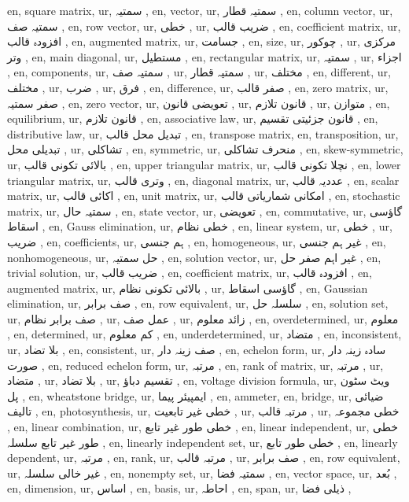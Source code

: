 en, square matrix,
ur, سمتیہ ,
en, vector,
ur, سمتیہ قطار ,
en, column vector,
ur, سمتیہ صف ,
en, row vector,
ur, خطی ,
ur,  ضریب قالب ,
en, coefficient matrix,
ur, افزودہ قالب ,
en, augmented matrix,
ur, جسامت ,
en, size,
ur, چوکور ,
ur, مرکزی وتر ,
en, main diagonal,
ur, مستطیل ,
en, rectangular matrix,
ur, سمتیہ ,
ur, اجزاء ,
en, components,
ur, سمتیہ صف ,
ur, سمتیہ قطار ,
ur, مختلف ,
en, different,
ur, مختلف ,
ur, ضرب ,
ur, فرق ,
en, difference,
ur, صفر قالب ,
en, zero matrix,
ur, صفر سمتیہ ,
en, zero vector,
ur, تعویضی قانون ,
ur, قانون تلازم ,
ur, متوازن ,
en, equilibrium,
ur, قانون تلازم ,
en, associative law,
ur, قانون جزئیتی تقسیم ,
en, distributive law,
ur, تبدیل محل قالب ,
en, transpose matrix,
en, transposition,
ur, تبدیلی محل ,
ur, تشاکلی ,
en, symmetric,
ur, منحرف تشاکلی ,
en, skew-symmetric,
ur, بالائی تکونی قالب ,
en, upper triangular matrix,
ur, نچلا تکونی قالب ,
en, lower triangular matrix,
ur, وتری قالب ,
en, diagonal matrix,
ur, عددیہ قالب ,
en, scalar matrix,
ur, اکائی قالب ,
en, unit matrix,
ur, امکانی شماریاتی قالب ,
en, stochastic matrix,
ur, سمتیہ حال ,
en, state vector,
ur, تعویضی ,
en, commutative,
ur, گاؤسی اسقاط ,
en, Gauss elimination,
ur, خطی نظام ,
en, linear system,
ur, خطی ,
ur, ضریب ,
en, coefficients,
ur, ہم جنسی ,
en, homogeneous,
ur, غیر ہم جنسی ,
en, nonhomogeneous,
ur, حل سمتیہ ,
en, solution vector,
ur, غیر اہم صفر حل ,
en, trivial solution,
ur,  ضریب قالب ,
en, coefficient matrix,
ur, افزودہ قالب ,
en, augmented matrix,
ur, بالائی تکونی نظام ,
ur, گاؤسی اسقاط ,
en, Gaussian elimination,
ur, صف برابر ,
en, row equivalent,
ur, سلسلہ حل ,
en, solution set,
ur, صف برابر نظام ,
ur, عمل صف ,
ur, زائد معلوم ,
en, overdetermined,
ur, معلوم ,
en, determined,
ur, کم معلوم ,
en, underdetermined,
ur, متضاد ,
en, inconsistent,
ur, بلا تضاد ,
en, consistent,
ur, صف زینہ دار ,
en, echelon form,
ur, سادہ زینہ دار صورت ,
en, reduced echelon form,
ur, مرتبہ ,
en, rank of matrix,
ur, مرتبہ ,
ur, متضاد ,
ur, بلا تضاد ,
ur, تقسیم دباؤ ,
en, voltage division formula,
ur, ویٹ سٹون پل ,
en, wheatstone bridge,
ur, ایمپیئر پیما ,
en, ammeter,
en, bridge,
ur, ضیائی تالیف ,
en, photosynthesis,
ur, خطی غیر تابعیت ,
ur, مرتبہ قالب ,
ur, خطی مجموعہ ,
en, linear combination,
ur, خطی طور غیر تابع ,
en, linear independent,
ur, خطی طور غیر تابع سلسلہ ,
en, linearly independent set,
ur, خطی طور تابع ,
en, linearly dependent,
ur, مرتبہ ,
en, rank,
ur, مرتبہ قالب ,
ur, صف برابر ,
en, row equivalent,
ur, غیر خالی سلسلہ ,
en, nonempty set,
ur, سمتیہ فضا ,
en, vector space,
ur, بُعد ,
en, dimension,
ur, اساس ,
en, basis,
ur, احاطہ ,
en, span,
ur, ذیلی فضا ,
